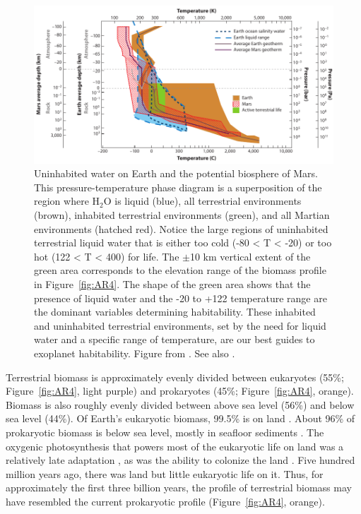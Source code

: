 \begin{figure}[!hbt]
	\centering
	\includegraphics[width=0.9\linewidth]{figures/AnnRevs/AR5.pdf}
	\caption[Uninhabited water on Earth \& Mars]{Uninhabited water on Earth and the potential biosphere of Mars. This pressure-temperature phase diagram is a superposition of the region where H$_{2}$O is liquid (blue), all terrestrial environments (brown), inhabited terrestrial environments (green), and all Martian environments (hatched red). Notice the large regions of uninhabited terrestrial liquid water that is either too cold ({-}80\textcelsius{} < T < {-}20\textcelsius{}) or too hot (122\textcelsius{} < T < 400\textcelsius{}) for life. The $\pm$10 km vertical extent of the green area corresponds to the elevation range of the biomass profile in Figure~\ref{fig:AR4}. The shape of the green area shows that the presence of liquid water and the {-}20\textcelsius{} to {+}122\textcelsius{} temperature range are the dominant variables determining habitability. These inhabited and uninhabited terrestrial environments, set by the need for liquid water and a specific range of temperature, are our best guides to exoplanet habitability. Figure from \citet{Jones2011}. See also \citet{Mottl2007,Jones2010,Jones2012,Cockell2011}.}
	\label{fig:AR5}
\end{figure}

Terrestrial biomass is approximately evenly divided between eukaryotes (55\%; Figure~\ref{fig:AR4}, light purple) and prokaryotes (45\%; Figure~\ref{fig:AR4}, orange). Biomass is also roughly evenly divided between above sea level (56\%) and below sea level (44\%). Of Earth's eukaryotic biomass, 99.5\% is on land \citep{Sundquist2014}. About 96\% of prokaryotic biomass is below sea level, mostly in seafloor sediments \citep{Whitman1998}. The oxygenic photosynthesis that powers most of the eukaryotic life on land was a relatively late adaptation \citep{Kiang2007, Sleep2007}, as was the ability to colonize the land \citep{Battistuzzi2004}. Five hundred million years ago, there was land but little eukaryotic life on it. Thus, for approximately the first three billion years, the profile of terrestrial biomass may have resembled the current prokaryotic profile (Figure~\ref{fig:AR4}, orange).


